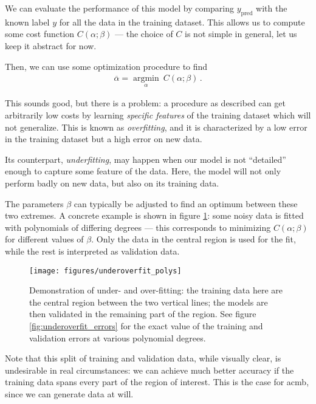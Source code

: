 \documentclass[main.tex]{subfiles}
\begin{document}
We can evaluate the performance of this model by comparing \(y _{\text{pred}}\) with the known label \(y\) for all the data in the training dataset.
This allows us to compute some cost function \(C(\alpha ; \beta )\) --- the choice of \(C\) is not simple in general, let us keep it abstract for now. 

Then, we can use some optimization procedure to find 
%
\begin{align}
\overline{\alpha} = \underset{\alpha }{\operatorname{argmin}}\  C(\alpha ; \beta )
\,.
\end{align}

This sounds good, but there is a problem: a procedure as described can get arbitrarily low costs by learning \emph{specific features} of the training dataset which will not generalize. This is known as \emph{overfitting}, and it is characterized by a low error in the training dataset but a high error on new data.


Its counterpart, \emph{underfitting}, may happen when our model is not ``detailed'' enough to capture some feature of the data. Here, the model will not only perform badly on new data, but also on its training data. 

The parameters \(\beta \) can typically be adjusted to find an optimum between these two extremes.
A concrete example is shown in figure \ref{fig:underoverfit_polys}: some noisy data is fitted with polynomials of differing degrees --- this corresponds to minimizing \(C(\alpha ; \beta )\) for different values of \(\beta \).
Only the data in the central region is used for the fit, while the rest is interpreted as validation data.

\begin{figure}[ht]
\centering
\texttt{[image: figures/underoverfit\_polys]}
\caption{Demonstration of under- and over-fitting: the training data here are the central region between the two vertical lines; the models are then validated in the remaining part of the region. See figure \ref{fig:underoverfit_errors} for the exact value of the training and validation errors at various polynomial degrees.}
\label{fig:underoverfit_polys}
\end{figure}

Note that this split of training and validation data, while visually clear, is undesirable in real circumstances: we can achieve much better accuracy if the training data spans every part of the region of interest.
This is the case for ac{mb}, since we can generate data at will. 
\end{document}
